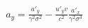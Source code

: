 \documentclass[preview]{standalone}
\begin{document}
\begin{align*}
a_y = \frac{a'_y}{\gamma^2 \sigma^2} - \frac{u'_y v}{c^2} \frac{a'_x}{\gamma^2 \sigma^3}
\end{align*}
\end{document}
